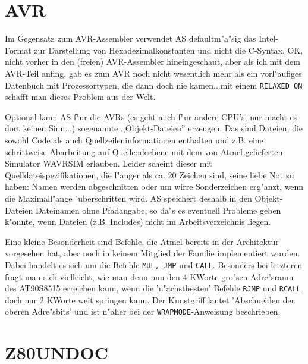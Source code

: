 \documentclass[12pt,a4paper,twoside]{report}
\newcommand{\tty}[1]{{\tt #1}}
\begin{document}
{%

\section{AVR}

Im Gegensatz zum AVR-Assembler verwendet AS defaultm"a"sig das Intel-Format
zur Darstellung von Hexadezimalkonstanten und nicht die C-Syntax.  OK, nicht
vorher in den (freien) AVR-Assembler hineingeschaut, aber als ich mit dem
AVR-Teil anfing, gab es zum AVR noch nicht wesentlich mehr als ein
vorl"aufiges Datenbuch mit Prozessortypen, die dann doch nie kamen...mit
einem \tty{RELAXED ON} schafft man dieses Problem aus der Welt.

Optional kann AS f"ur die AVRs (es geht auch f"ur andere CPU's, nur
macht es dort keinen Sinn...) sogenannte ,,Objekt-Dateien'' erzeugen.
Das sind Dateien, die sowohl Code als auch Quellzeileninformationen
enthalten und z.B. eine schrittweise Abarbeitung auf Quellcodeebene
mit dem von Atmel gelieferten Simulator WAVRSIM erlauben.  Leider
scheint dieser mit Quelldateispezifikationen, die l"anger als ca. 20
Zeichen sind, seine liebe Not zu haben: Namen werden abgeschnitten
oder um wirre Sonderzeichen erg"anzt, wenn die Maximall"ange "uberschritten
wird.  AS speichert deshalb in den Objekt-Dateien Dateinamen ohne
Pfadangabe, so da"s es eventuell Probleme geben k"onnte, wenn
Dateien (z.B. Includes) nicht im Arbeitsverzeichnis liegen.

Eine kleine Besonderheit sind Befehle, die Atmel bereits in der
Architektur vorgesehen hat, aber noch in keinem Mitglied der Familie
implementiert wurden.  Dabei handelt es sich um die Befehle {\tt MUL, JMP}
und {\tt CALL}.  Besonders bei letzteren fragt man sich vielleicht, wie man
denn nun den 4 KWorte gro"sen Adre"sraum des AT90S8515 erreichen kann,
wenn die 'n"achstbesten' Befehle {\tt RJMP} und {\tt RCALL} doch nur 2
KWorte weit springen kann.  Der Kunstgriff lautet 'Abschneiden der oberen
Adre"sbits' und ist n"aher bei der {\tt WRAPMODE}-Anweisung beschrieben.


\section{Z80UNDOC}

}
\end{document}

